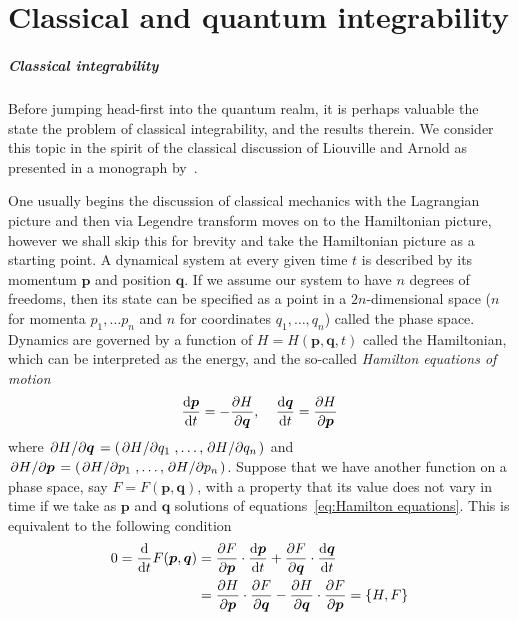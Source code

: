 \chapter{Classical and quantum integrability\label{app:int}}
\thispagestyle{chapterBeginStyle}

\paragraph{Classical integrability}Before jumping head-first into the quantum realm, it is perhaps valuable the state
the problem of classical integrability, and the results therein.
We consider this topic in the spirit of the classical discussion
of Liouville and Arnold as presented in a monograph by~\textcite{Gutzwiller1991}.

One usually begins the discussion of classical mechanics with the Lagrangian picture and then
via Legendre transform moves on to the Hamiltonian picture, however we shall skip this
for brevity and take the Hamiltonian picture as a starting point.
A dynamical system at every given time \(t\) is described by its momentum \(\bm{p}\) and
position \(\bm{q}\). If we assume our system to have \(n\) degrees of freedoms, then
its state can be specified as a point in a \(2n\)-dimensional space (\(n\) for momenta
\(p_1,\ldots p_n\) and \(n\) for coordinates \(q_1, \ldots, q_n\)) called the phase space. Dynamics are governed by a function
of \(H = H(\bm{p},\bm{q},t)\) called the Hamiltonian, which can be interpreted as the energy,
and the so-called \textit{Hamilton equations of motion}
\begin{equation}
    \dv{\bm{p}}{t} = -\pdv{H}{\bm{q}},\; \; \; \; \dv{\bm{q}}{t} = \pdv{H}{\bm{p}}
    \label{eq:Hamilton equations}
\end{equation} 
where \(\pdv*{H}{\bm{q}} = \left(\pdv*{H}{q_1},\ldots, \pdv*{H}{q_n}\right)\)
and \(\pdv*{H}{\bm{p}} = \left(\pdv*{H}{p_1},\ldots, \pdv*{H}{p_n}\right)\).
Suppose that we have another function on a phase space, say \(F=F(\bm{p},\bm{q})\), with
a property that its value does not vary in time if we take as \(\bm{p}\) and \(\bm{q}\) solutions
of equations~\eqref{eq:Hamilton equations}. This is equivalent to the following condition
\begin{align}
    0 = \dv{}{t}F(\bm{p},\bm{q}) &= \pdv{F}{\bm{p}}\cdot \dv{\bm{p}}{t} + \pdv{F}{\bm{q}}\cdot\dv{\bm{q}}{t} \nonumber{}\\
    &= \pdv{H}{\bm{p}}\cdot\pdv{F}{\bm{q}} - \pdv{H}{\bm{q}}\cdot\pdv{F}{\bm{p}} = \poissonbracket{H}{F}
\end{align}

